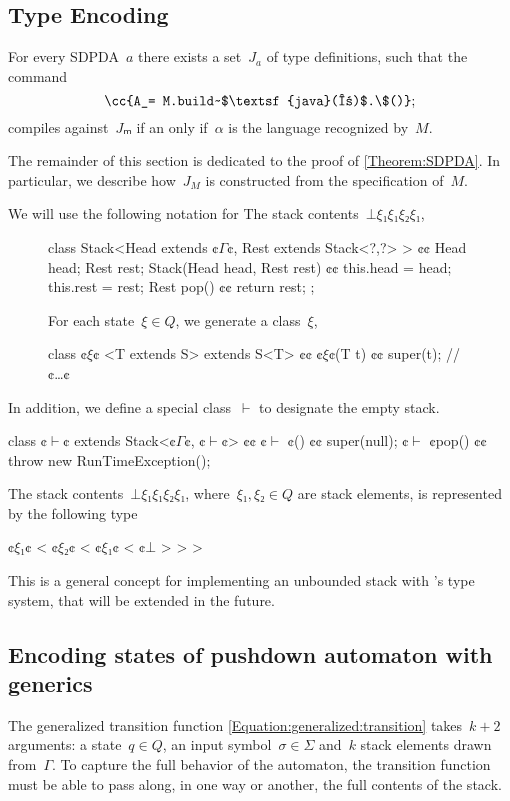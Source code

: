 \subsection{Type Encoding}
\begin{Theorem}
  \label{Theorem:SDPDA}
  For every SDPDA~$a$ there exists a set~$J_a$ of \Java type definitions, such that
  the command \[
    \cc{A_= M.build~$\textsf{java}(α)$.\$()};
  \]
  compiles against~$Jₘ$ if an only if~$α$ is the language recognized by~$M$.
\end{Theorem}

The remainder of this section is dedicated to the proof of \cref{Theorem:SDPDA}.
In particular, we describe how~$J_M$ is constructed from the
  specification of~$M$.

We will use the following notation for
The stack contents~$⊥ξ₁ξ₁ξ₂ξ₁$,

\begin{figure}[H]
\begin{JAVA}
class Stack<Head extends ¢$Γ$¢, Rest extends Stack<?,?> > {¢¢
  Head head;
  Rest rest;
  Stack(Head head, Rest rest) {¢¢ this.head = head; this.rest = rest;}
  Rest pop() {¢¢ return rest; };
}
\end{JAVA}
For each state~$ξ∈Q$, we generate a \Java class~$ξ$,
\begin{JAVA}
class ¢$ξ$¢ <T extends S> extends S<T> {¢¢
  ¢$ξ$¢(T t) {¢¢ super(t); }
  // ¢…¢
}
\end{JAVA}
\end{figure}
In addition, we define a special class~$\vdash$ to designate the empty stack.
\begin{JAVA}
class ¢$\vdash$¢ extends Stack<¢$Γ$¢, ¢$\vdash$¢> {¢¢
  ¢$\vdash$ ¢() {¢¢ super(null); }
  ¢$\vdash$ ¢pop() {¢¢ throw new RunTimeException(); }
}
\end{JAVA}
The stack contents~$⊥ξ₁ξ₁ξ₂ξ₁$,
where~$ξ₁,ξ₂∈Q$ are stack elements,
is represented by the following type
\begin{JAVA}
  ¢$ξ₁$¢ < ¢$ξ₂$¢ < ¢$ξ₁$¢ < ¢$⊥$ > > >
\end{JAVA}
This is a general concept for implementing an unbounded stack with \Java's type system,
that will be extended in the future.


\subsection{Encoding states of pushdown automaton with \Java generics}
The generalized transition function \cref{Equation:generalized:transition}
  takes~$k+2$ arguments: a state~$q∈Q$, an input symbol~$σ∈Σ$
    and~$k$ stack elements drawn from~$Γ$.
To capture the full behavior of the automaton, the transition function
  must be able to pass along, in one way or another, the full contents of the stack.

